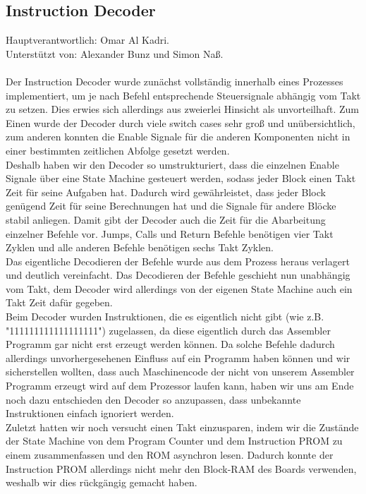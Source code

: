 \documentclass[bibliography=totoc,listof=totoc,index=totoc]{scrartcl}
\begin{document}
\subsection{Instruction Decoder}
Hauptverantwortlich: Omar Al Kadri.\\
Unterstützt von: Alexander Bunz und Simon Naß.\\\\
Der Instruction Decoder wurde zunächst vollständig innerhalb eines Prozesses implementiert, um je nach Befehl entsprechende Steuersignale abhängig vom Takt zu setzen. Dies erwies sich allerdings aus zweierlei Hinsicht als unvorteilhaft. Zum Einen wurde der Decoder durch viele switch cases sehr groß und unübersichtlich, zum anderen konnten die Enable Signale für die anderen Komponenten nicht in einer bestimmten zeitlichen Abfolge gesetzt werden. \\
Deshalb haben wir den Decoder so umstrukturiert, dass die einzelnen Enable Signale über eine State Machine gesteuert werden, sodass jeder Block einen Takt Zeit für seine Aufgaben hat. Dadurch wird gewährleistet, dass jeder Block genügend Zeit für seine Berechnungen hat und die Signale für andere Blöcke stabil anliegen. Damit gibt der Decoder auch die Zeit für die Abarbeitung einzelner Befehle vor. Jumps, Calls und Return Befehle benötigen vier Takt Zyklen und alle anderen Befehle benötigen sechs Takt Zyklen. \\
Das eigentliche Decodieren der Befehle wurde aus dem Prozess heraus verlagert und deutlich vereinfacht. Das Decodieren der Befehle geschieht nun unabhängig vom Takt, dem Decoder wird allerdings von der eigenen State Machine auch ein Takt Zeit dafür gegeben. \\
Beim Decoder wurden Instruktionen, die es eigentlich nicht gibt (wie z.B. "111111111111111111") zugelassen, da diese eigentlich durch das Assembler Programm gar nicht erst erzeugt werden können. Da solche Befehle dadurch allerdings unvorhergesehenen Einfluss auf ein Programm haben können und wir sicherstellen wollten, dass auch Maschinencode der nicht von unserem Assembler Programm erzeugt wird auf dem Prozessor laufen kann, haben wir uns am Ende noch dazu entschieden den Decoder so anzupassen, dass unbekannte Instruktionen einfach ignoriert werden. \\
Zuletzt hatten wir noch versucht einen Takt einzusparen, indem wir die Zustände der State Machine von dem Program Counter und dem Instruction PROM zu einem zusammenfassen und den ROM asynchron lesen. Dadurch konnte der Instruction PROM allerdings nicht mehr den Block-RAM des Boards verwenden, weshalb wir dies rückgängig gemacht haben.
\end{document}
